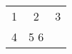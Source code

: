 \documentclass{class}
\begin{document}
\begin{tabular}{ l c r }
1 & 2 & 3 \\
4 & 5 6 \\
\end{tabular}
\end{document}

